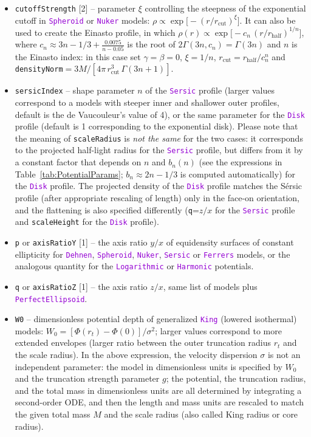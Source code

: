 \documentclass[12pt]{article}
\newcommand{\ttt}[1]{\textcolor{darkviolet}{\texttt{#1}}}
\newcommand{\ppp}[1]{\textcolor{darkolive} {\texttt{#1}}}
\begin{document}
\begin{itemize}
\item \ppp{cutoffStrength} [2] -- parameter $\xi$ controlling the steepness of the exponential cutoff in \ttt{Spheroid} or \ttt{Nuker} models: $\rho \propto \exp\big[-(r/r_\mathrm{cut})^\xi\big]$. It can also be used to create the Einasto profile, in which $\rho(r)\propto \exp\big[-c_n\,(r/r_\mathrm{half})^{1/n}\big]$, where $c_n\approx 3n-1/3+\frac{0.0075}{n-0.05}$ is the root of $2\Gamma(3n,c_n)=\Gamma(3n)$ and $n$ is the Einasto index: in this case set $\gamma=\beta=0$, $\xi=1/n$, $r_\mathrm{cut}=r_\mathrm{half}/c_n^n$ and \ppp{densityNorm}${}=3M / [4\pi\,r_\mathrm{cut}^3\,\Gamma(3n+1)]$.
\item \ppp{sersicIndex} -- shape parameter $n$ of the \ttt{Sersic} profile (larger values correspond to a models with steeper inner and shallower outer profiles, default is the de Vaucouleur's value of 4), or the same parameter for the \ttt{Disk} profile (default is 1 corresponding to the exponential disk). Please note that the meaning of \ppp{scaleRadius} is \textit{not the same} for the two cases: it corresponds to the projected half-light radius for the \ttt{Sersic} profile, but differs from it by a constant factor that depends on $n$ and $b_n(n)$ (see the expressions in Table~\ref{tab:PotentialParams}; $b_n\approx 2n-1/3$ is computed automatically) for the \ttt{Disk} profile. The projected density of the \ttt{Disk} profile matches the S\'ersic profile (after appropriate rescaling of length) only in the face-on orientation, and the flattening is also specified differently (\ppp{q}=$z/x$ for the \ttt{Sersic} profile and \ppp{scaleHeight} for the \ttt{Disk} profile).
\item \ppp{p} or \ppp{axisRatioY} [1] -- the axis ratio $y/x$ of equidensity surfaces of constant ellipticity for \ttt{Dehnen}, \ttt{Spheroid}, \ttt{Nuker}, \ttt{Sersic} or \ttt{Ferrers} models, or the analogous quantity for the \ttt{Logarithmic} or \ttt{Harmonic} potentials.
\item \ppp{q} or \ppp{axisRatioZ} [1] -- the axis ratio $z/x$, same list of models plus \ttt{PerfectEllipsoid}.
\item \ppp{W0} -- dimensionless potential depth of generalized \ttt{King} (lowered isothermal) models: $W_0 = [ \Phi(r_t) - \Phi(0) ] / \sigma^2$; larger values correspond to more extended envelopes (larger ratio between the outer truncation radius $r_t$ and the scale radius). In the above expression, the velocity dispersion $\sigma$ is not an independent parameter: the model in dimensionless units is specified by $W_0$ and the truncation strength parameter $g$; the potential, the truncation radius, and the total mass in dimensionless units are all determined by integrating a second-order ODE, and then the length and mass units are rescaled to match the given total mass $M$ and the scale radius (also called King radius or core radius).

\end{itemize}
\end{document}
